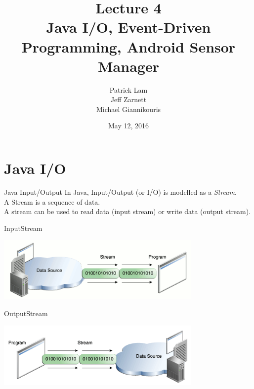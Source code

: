 \documentclass[aspectratio=169]{beamer}
\title{Lecture 4 \\ Java I/O, Event-Driven Programming, Android Sensor Manager}
\date{May 12, 2016}
\author{Patrick Lam \\ Jeff Zarnett \\ Michael Giannikouris}
\institute{Department of Electrical and Computer Engineering}
\begin{document}
\maketitle



\section*{Java I/O}



\begin{frame}{Java Input/Output}
In Java, Input/Output (or I/O) is modelled as a \textit{Stream}. \\
\vspace{1em}
A Stream is a sequence of data. \\
\vspace{1em}
A stream can be used to read data (input stream) or write data (output stream). \\
\end{frame}



\begin{frame}{InputStream}
\begin{center}
\includegraphics[width=0.75\textwidth]{img/inputstream.png}
\end{center}
\end{frame}



\begin{frame}{OutputStream}
\begin{center}
\includegraphics[width=0.75\textwidth]{img/outputstream.png}
\end{center}
\end{frame}
\end{document}
